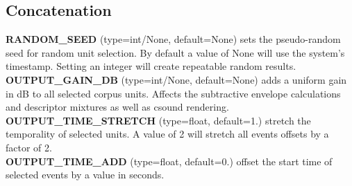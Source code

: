 \documentclass{article}
\newcommand{\optEntry}[4]{\textbf{#1} (type=#2, default=#3) #4\hspace{0.5em}\\}
\begin{document}
\begin{spacing}{1.2}
\subsection{Concatenation}
\optEntry{RANDOM\_SEED}{int/None}{None}{sets the pseudo-random seed for random unit selection.  By default a value of None will use the system's timestamp.  Setting an integer will create repeatable random results.}

\optEntry{OUTPUT\_GAIN\_DB}{int/None}{None}{adds a uniform gain in dB to all selected corpus units.  Affects the subtractive envelope calculations and descriptor mixtures as well as csound rendering.}

\optEntry{OUTPUT\_TIME\_STRETCH}{float}{1.}{stretch the temporality of selected units.  A value of 2 will stretch all events offsets by a factor of 2.}

\optEntry{OUTPUT\_TIME\_ADD}{float}{0.}{offset the start time of selected events by a value in seconds.}




\end{spacing}
\end{document}
